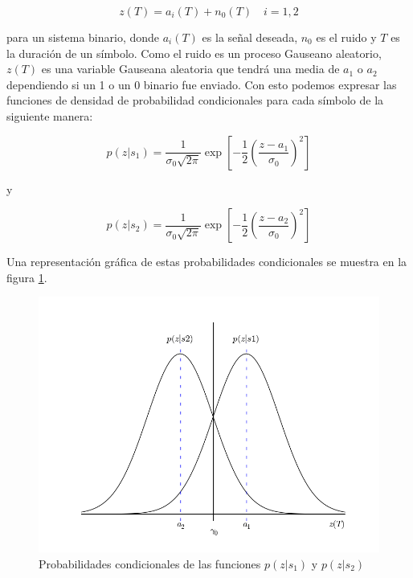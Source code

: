 \begin{equation}\label{eq:demgauss}
z(T)=a_i(T)+n_0(T) \quad i=1,2
\end{equation}

para un sistema binario, donde $a_i(T)$ es la se\~nal deseada, $n_0$ es el ruido y $T$ es la duraci\'on de un s\'imbolo. Como
el ruido es un proceso Gauseano aleatorio, $z(T)$ es una variable Gauseana aleatoria que tendr\'a una media de
$a_1$ o $a_2$ dependiendo si un 1 o un 0 binario fue enviado. Con esto podemos expresar las
funciones de densidad de probabilidad condicionales para cada s\'imbolo de la siguiente manera:

\begin{equation}
p(z|s_1)=\frac{1}{\sigma_0
\sqrt{2\pi}}\exp{\left[-\frac{1}{2}\left(\frac{z-a_1}{\sigma_0}\right)^2 \right]}
\end{equation}

y

\begin{equation}
p(z|s_2)=\frac{1}{\sigma_0
\sqrt{2\pi}}\exp{\left[-\frac{1}{2}\left(\frac{z-a_2}{\sigma_0}\right)^2 \right]}
\end{equation}

Una representaci\'on gr\'afica de estas probabilidades condicionales se muestra en la figura
\ref{fig:condpdf}.

\begin{figure}[htp]
\centering
	\includegraphics[width=5.5in]{figs/condpdf}
	\caption{Probabilidades condicionales de las funciones $p(z|s_1)$ y $p(z|s_2)$}
	\label{fig:condpdf}
\end{figure}

